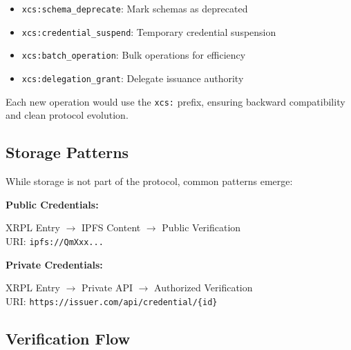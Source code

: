 \documentclass[11pt,a4paper]{article}
\begin{document}
\begin{itemize}
    \item \texttt{xcs:schema\_deprecate}: Mark schemas as deprecated
    \item \texttt{xcs:credential\_suspend}: Temporary credential suspension
    \item \texttt{xcs:batch\_operation}: Bulk operations for efficiency
    \item \texttt{xcs:delegation\_grant}: Delegate issuance authority
\end{itemize}

Each new operation would use the \texttt{xcs:} prefix, ensuring backward compatibility and clean protocol evolution.
\subsection{Storage Patterns}

While storage is not part of the protocol, common patterns emerge:

\textbf{Public Credentials:}
\begin{center}
XRPL Entry $\rightarrow$ IPFS Content $\rightarrow$ Public Verification\\
URI: \texttt{ipfs://QmXxx...}
\end{center}

\textbf{Private Credentials:}
\begin{center}
XRPL Entry $\rightarrow$ Private API $\rightarrow$ Authorized Verification\\
URI: \texttt{https://issuer.com/api/credential/\{id\}}
\end{center}

\subsection{Verification Flow}
\end{document}
